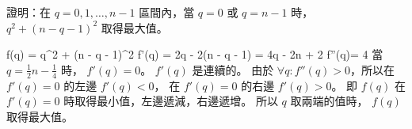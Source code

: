\startEXERCISE
證明：在 $q=0, 1, \ldots, n-1$ 區間內，當 $q=0$ 或 $q=n-1$ 時，
 $q^2+(n-q-1)^2$ 取得最大值。
\stopEXERCISE

\startANSWER
\startsplitformula\startmathalignment
\NC f(q)  \NC= q^2 + (n - q - 1)^2 \NR
\NC f'(q) \NC= 2q - 2(n - q - 1) = 4q - 2n + 2 \NR
\NC f''(q)\NC= 4 \NR
\stopmathalignment\stopsplitformula
當 $q=\frac{1}{2}n-\frac{1}{4}$ 時， $f'(q)=0$。
$f'(q)$ 是連續的。
由於 $\forall q : f''(q) > 0$，所以在 $f'(q) =0$ 的左邊 $f'(q)<0$，
在 $f'(q) =0$ 的右邊 $f'(q)>0$。
即 $f(q)$ 在 $f'(q)=0$ 時取得最小值，左邊遞減，右邊遞增。
所以 $q$ 取兩端的值時， $f(q)$ 取得最大值。
\stopANSWER

